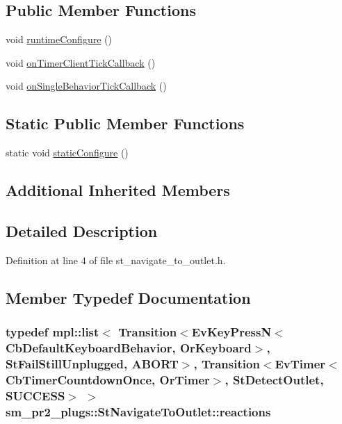 \subsection*{Public Member Functions}
\begin{DoxyCompactItemize}
\item 
void \hyperlink{structsm__pr2__plugs_1_1StNavigateToOutlet_aa36e4f478b3dc1c2b8fae6ef51f4d4f8}{runtime\+Configure} ()
\item 
void \hyperlink{structsm__pr2__plugs_1_1StNavigateToOutlet_ab990f0f422deb0ef6dd4fcce9cb2823b}{on\+Timer\+Client\+Tick\+Callback} ()
\item 
void \hyperlink{structsm__pr2__plugs_1_1StNavigateToOutlet_ae6a6ee95bcc854792f0b16286a113a06}{on\+Single\+Behavior\+Tick\+Callback} ()
\end{DoxyCompactItemize}
\subsection*{Static Public Member Functions}
\begin{DoxyCompactItemize}
\item 
static void \hyperlink{structsm__pr2__plugs_1_1StNavigateToOutlet_a2dbe242376149d872ee92006b378ebf9}{static\+Configure} ()
\end{DoxyCompactItemize}
\subsection*{Additional Inherited Members}


\subsection{Detailed Description}


Definition at line 4 of file st\+\_\+navigate\+\_\+to\+\_\+outlet.\+h.



\subsection{Member Typedef Documentation}
\subsubsection[{\texorpdfstring{reactions}{reactions}}]{\setlength{\rightskip}{0pt plus 5cm}typedef mpl\+::list$<$ Transition$<$Ev\+Key\+PressN$<$Cb\+Default\+Keyboard\+Behavior, {\bf Or\+Keyboard}$>$, {\bf St\+Fail\+Still\+Unplugged}, {\bf A\+B\+O\+RT}$>$, Transition$<$Ev\+Timer$<$Cb\+Timer\+Countdown\+Once, {\bf Or\+Timer}$>$, {\bf St\+Detect\+Outlet}, {\bf S\+U\+C\+C\+E\+SS}$>$ $>$ {\bf sm\+\_\+pr2\+\_\+plugs\+::\+St\+Navigate\+To\+Outlet\+::reactions}}\hypertarget{structsm__pr2__plugs_1_1StNavigateToOutlet_a4b5b4d30a2a64c438e9a4d89016fc052}{}\label{structsm__pr2__plugs_1_1StNavigateToOutlet_a4b5b4d30a2a64c438e9a4d89016fc052}


